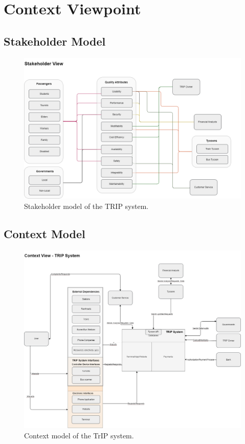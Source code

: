 \section{Context Viewpoint}

\subsection{Stakeholder Model}
\begin{figure}[H]
    \centering
    \includegraphics[width=\textwidth]{drawings/views_final_version/stakeholder_view.png}
    \caption{Stakeholder model of the TRIP system.}
    \label{fig:stakeholder_view_model}
\end{figure}

\subsection{Context Model}
\begin{figure}[H]
    \centering
    \includegraphics[width=\textwidth]{drawings/views_final_version/context_view.png}
    \caption{Context model of the TrIP system.}
    \label{fig:context_view_model}
\end{figure}

